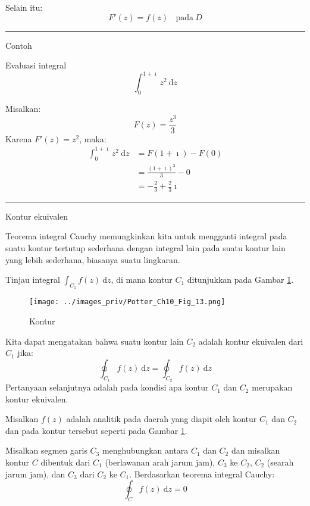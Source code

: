Selain itu:
\begin{equation*}
F'(z)=f(z)\ \ \ \ \text{pada}\ D
\end{equation*}

\rule[0.5ex]{1\columnwidth}{1pt}

Contoh

Evaluasi integral
\begin{equation*}
\int_{0}^{1 + \imath}z^{2}\ \mathrm{d}z
\end{equation*}

Misalkan:
\begin{equation*}
F(z)=\frac{z^{3}}{3}
\end{equation*}
Karena $F'(z) = z^{2}$, maka:
\begin{align*}
\int_{0}^{1+\imath}z^{2}\ \mathrm{d}z & =F(1+\imath)-F(0)\\
 & =\frac{(1+\imath)^{3}}{3}-0\\
 & =-\frac{2}{3}+\frac{2}{3}\imath
\end{align*}

\rule[0.5ex]{1\columnwidth}{1pt}

Kontur ekuivalen

Teorema integral Cauchy memungkinkan kita untuk mengganti integral
pada suatu kontur tertutup sederhana dengan integral lain pada suatu
kontur lain yang lebih sederhana, biasanya suatu lingkaran.

Tinjau integral $\int_{C_{1}}f(z)\ \mathrm{d}z$, di mana kontur $C_{1}$
ditunjukkan pada Gambar \ref{fig:Potter_Fig_10_13}.

\begin{figure}[h]
{\centering
\texttt{[image: ../images\_priv/Potter\_Ch10\_Fig\_13.png]}
\par}
\caption{Kontur}\label{fig:Potter_Fig_10_13}
\end{figure}

Kita dapat mengatakan bahwa suatu kontur lain $C_{2}$ adalah kontur
ekuivalen dari $C_{1}$ jika:
\begin{equation*}
\oint_{C_{1}}f(z)\ \mathrm{d}z=\oint_{C_{2}}f(z)\ \mathrm{d}z
\end{equation*}
Pertanyaan selanjutnya adalah pada kondisi apa kontur $C_{1}$ dan
$C_{2}$ merupakan kontur ekuivalen.

Misalkan $f(z)$ adalah analitik pada daerah yang diapit oleh kontur
$C_{1}$ dan $C_{2}$ dan pada kontur tersebut seperti pada Gambar
\ref{fig:Potter_Fig_10_13}.

Misalkan segmen garis $C_{3}$ menghubungkan antara $C_{1}$ dan $C_{2}$
dan misalkan kontur $C$ dibentuk dari $C_{1}$ (berlawanan arah jarum
jam), $C_{3}$ ke $C_{2}$, $C_{2}$ (searah jarum jam), dan $C_{3}$
dari $C_{2}$ ke $C_{1}$. Berdasarkan teorema integral Cauchy:
\begin{equation*}
\oint_{C}f(z)\ \mathrm{d}z=0
\end{equation*}

